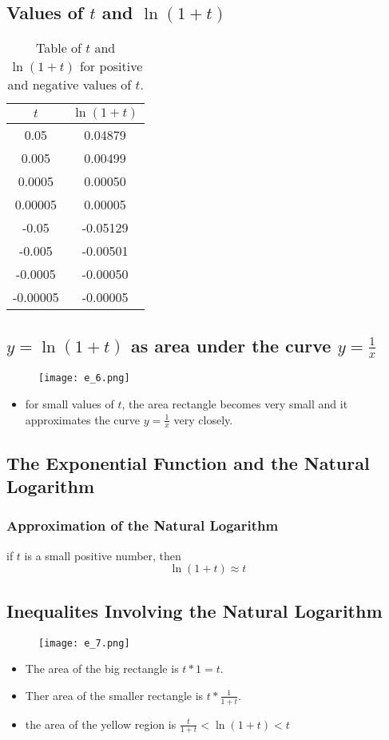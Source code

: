 \subsection{Values of \(t\) and \(\ln(1+t)\)}
\begin{table}[]
  \centering
  \begin{tabular}{|c|c|}
    \hline
    \(t\) & \(\ln(1+t)\) \\ \hline
    0.05 & 0.04879 \\
    0.005 & 0.00499 \\
    0.0005 & 0.00050 \\
    0.00005 & 0.00005 \\
    -0.05 & -0.05129 \\
    -0.005 & -0.00501 \\
    -0.0005 & -0.00050 \\
    -0.00005 & -0.00005 \\
    \hline
  \end{tabular}
  \caption{Table of \(t\) and \(\ln(1+t)\) for positive and negative values of \(t\).}
\end{table}

\subsection{\(y = \ln(1+t)\) as area under the curve \(y = \frac{1}{x}\)}
\begin{figure}
  \centering
  \texttt{[image: e\_6.png]}
\end{figure}
\begin{itemize}
  \item for small values of \(t\), the area rectangle becomes very small and it approximates the curve \(y = \frac{1}{x}\) very closely.
\end{itemize}

\subsection{The Exponential Function and the Natural Logarithm}
\subsubsection{Approximation of the Natural Logarithm}
if \(t\) is a small positive number, then
\[ \ln(1+t) \approx t \]

\subsection{Inequalites Involving the Natural Logarithm}
\begin{figure}
  \centering
  \texttt{[image: e\_7.png]}
\end{figure}
\begin{itemize}
  \item The area of the big rectangle is \( t * 1 = t \).
  \item Ther area of the smaller rectangle is \( t * \frac{1}{1+t} \).
  \item the area of the yellow region is \(   \frac{t}{1+t}  < \ln(1+t) < t \)
\end{itemize}

